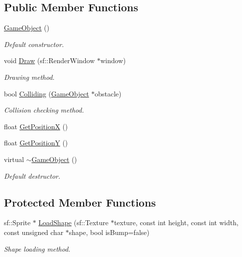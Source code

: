 \subsection*{Public Member Functions}
\begin{DoxyCompactItemize}
\item 
\mbox{\hyperlink{class_game_object_a0348e3ee2e83d56eafca7a3547f432c4}{Game\+Object}} ()
\begin{DoxyCompactList}\small\item\em Default constructor. \end{DoxyCompactList}\item 
void \mbox{\hyperlink{class_game_object_a7ba982dd7315ab822c18dd9892112316}{Draw}} (sf\+::\+Render\+Window $\ast$window)
\begin{DoxyCompactList}\small\item\em Drawing method. \end{DoxyCompactList}\item 
bool \mbox{\hyperlink{class_game_object_a9f63ba7fa09d165f175858276f71d44b}{Colliding}} (\mbox{\hyperlink{class_game_object}{Game\+Object}} $\ast$obstacle)
\begin{DoxyCompactList}\small\item\em Collision checking method. \end{DoxyCompactList}\item 
float \mbox{\hyperlink{class_game_object_a274bf74e1658d845a0603be2972a63c4}{Get\+PositionX}} ()
\item 
float \mbox{\hyperlink{class_game_object_abe7e418773edb98562033fcfdf191dd9}{Get\+PositionY}} ()
\item 
\mbox{\label{class_game_object_ab82dfdb656f9051c0587e6593b2dda97}} 
virtual \mbox{\hyperlink{class_game_object_ab82dfdb656f9051c0587e6593b2dda97}{$\sim$\+Game\+Object}} ()
\begin{DoxyCompactList}\small\item\em Default destructor. \end{DoxyCompactList}\end{DoxyCompactItemize}
\subsection*{Protected Member Functions}
\begin{DoxyCompactItemize}
\item 
sf\+::\+Sprite $\ast$ \mbox{\hyperlink{class_game_object_ab570c73233f2e8eb9fb3c043b1a68c4c}{Load\+Shape}} (sf\+::\+Texture $\ast$texture, const int height, const int width, const unsigned char $\ast$shape, bool is\+Bump=false)
\begin{DoxyCompactList}\small\item\em Shape loading method. \end{DoxyCompactList}\end{DoxyCompactItemize}
